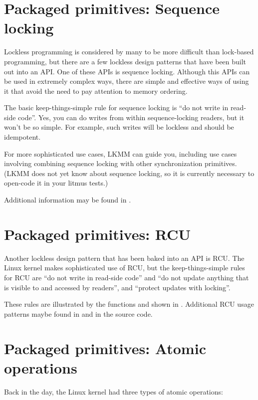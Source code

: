 \section{Packaged primitives: Sequence locking}

Lockless programming is considered by many to be more difficult than
lock-based programming, but there are a few lockless design patterns that
have been built out into an API\@.
One of these APIs is sequence locking.
Although this APIs can be used in extremely complex ways, there are simple
and effective ways of using it that avoid the need to pay attention to
memory ordering.

The basic keep-things-simple rule for sequence locking is ``do not write
in read-side code''.
Yes, you can do writes from within sequence-locking readers, but it
won't be so simple.
For example, such writes will be lockless and should be idempotent.

For more sophisticated use cases, LKMM can guide you, including use
cases involving combining sequence locking with other synchronization
primitives.
(LKMM does not yet know about sequence locking, so it is currently
necessary to open-code it in your litmus tests.)

Additional information may be found in .

\section{Packaged primitives: RCU}

Another lockless design pattern that has been baked into an API
is RCU\@.
The Linux kernel makes sophisticated use of RCU, but the
keep-things-simple rules for RCU are ``do not write in read-side code''
and ``do not update anything that is visible to and accessed by readers'',
and ``protect updates with locking''.

These rules are illustrated by the functions  and
 shown in .
Additional RCU usage patterns maybe found in 
and in the source code.


\section{Packaged primitives: Atomic operations}

Back in the day, the Linux kernel had three types of atomic operations:

